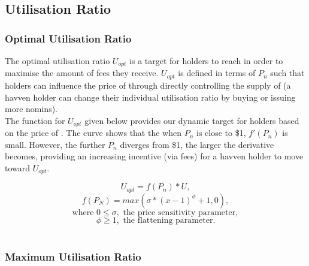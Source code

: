 \newpage
\subsection{Utilisation Ratio}
\subsubsection{Optimal Utilisation Ratio}

\noindent The optimal utilisation ratio $U_{opt}$ is a target for \HAV{} holders to reach in order to maximise the amount of fees they receive. $U_{opt}$ is defined in terms of $P_n$ such that \HAV{} holders can influence the price of \NOM{} through directly controlling the supply of \NOM{} (a havven holder can change their individual utilisation ratio by buying or issuing more nomins). \\
 
\noindent The function for $U_{opt}$ given below provides our dynamic target for \HAV{} holders based on the price of \NOM{}. The curve shows that the when $P_n$ is close to \$1, $ f'(P_n) $ is small. However, the further $P_n$ diverges from \$1, the larger the derivative becomes, providing an increasing incentive (via fees) for a havven holder to move toward $U_{opt}$.

$$ U_{opt} = f(P_n) * U,$$
$$ f(P_N) = max(\sigma * (x - 1)^{\phi} + 1, 0), $$
$$\text{where } 0 \leq \sigma, \text{ the price sensitivity parameter}, $$
$$\phi \geq 1, \text{ the flattening parameter}. $$ \\

\begin{center}
\end{center}

\newpage

\subsubsection{Maximum Utilisation Ratio}

